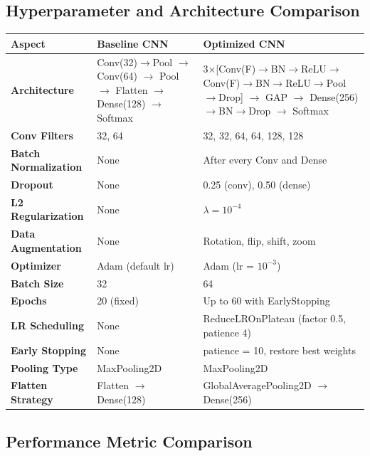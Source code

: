 \documentclass[11pt]{article}
\begin{document}
\subsection{Hyperparameter and Architecture Comparison}
\begin{table}[H]
    \centering
    \renewcommand{\arraystretch}{1.35}
    \begin{tabular}{|p{4.5cm}|p{4.5cm}|p{4.5cm}|}
        \hline
        \textbf{Aspect} & \textbf{Baseline CNN} & \textbf{Optimized CNN} \\ \hline
        \textbf{Architecture} &
        Conv(32)$\to$Pool $\to$ Conv(64) $\to$ Pool $\to$ Flatten $\to$ Dense(128) $\to$ Softmax &
        3$\times$[Conv(F)$\to$BN$\to$ReLU$\to$Conv(F)$\to$BN$\to$ReLU$\to$Pool$\to$Drop] $\to$ GAP $\to$ Dense(256)$\to$BN$\to$Drop $\to$ Softmax \\ \hline
        \textbf{Conv Filters} & 32, 64 & 32, 32, 64, 64, 128, 128 \\ \hline
        \textbf{Batch Normalization} & None & After every Conv and Dense \\ \hline
        \textbf{Dropout} & None & 0.25 (conv), 0.50 (dense) \\ \hline
        \textbf{L2 Regularization} & None & $\lambda = 10^{-4}$ \\ \hline
        \textbf{Data Augmentation} & None & Rotation, flip, shift, zoom \\ \hline
        \textbf{Optimizer} & Adam (default lr) & Adam (lr = $10^{-3}$) \\ \hline
        \textbf{Batch Size} & 32 & 64 \\ \hline
        \textbf{Epochs} & 20 (fixed) & Up to 60 with EarlyStopping \\ \hline
        \textbf{LR Scheduling} & None & ReduceLROnPlateau (factor 0.5, patience 4) \\ \hline
        \textbf{Early Stopping} & None & patience = 10, restore best weights \\ \hline
        \textbf{Pooling Type} & MaxPooling2D & MaxPooling2D \\ \hline
        \textbf{Flatten Strategy} & Flatten $\to$ Dense(128) & GlobalAveragePooling2D $\to$ Dense(256) \\ \hline
    \end{tabular}
\end{table}

\subsection{Performance Metric Comparison}
\end{document}
